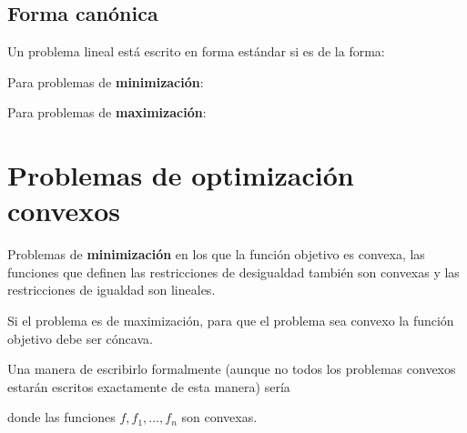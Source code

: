 

\subsection{Forma canónica}

\begin{defn}
Un problema lineal está escrito en forma estándar si es de la forma:


Para problemas de \textbf{minimización}:

\begin{ioprob}
\end{ioprob}


 
Para problemas de \textbf{maximización}:

\begin{ioprob}
\end{ioprob}

\end{defn}


\section{Problemas de optimización convexos}

\begin{defn}
Problemas de \textbf{minimización} en los que la función objetivo es convexa, las funciones que definen las restricciones de desigualdad también son convexas y las restricciones de igualdad son lineales. 

Si el problema es de maximización, para que el problema sea convexo la función objetivo debe ser cóncava.
\end{defn}

Una manera de escribirlo formalmente (aunque no todos los problemas convexos estarán escritos exactamente de esta manera) sería
\begin{ioprob}
donde las funciones $f,f_1,\ldots, f_n$ son convexas.
\end{ioprob}


